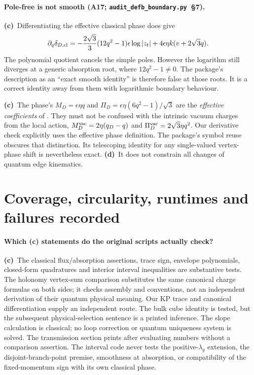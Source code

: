 \documentclass[11pt,a4paper]{article}
\newcommand{\Lc}{\textbf{(c)}\ }
\newcommand{\Ld}{\textbf{(d)}\ }
\newcommand{\scr}{\texttt{audit\_\allowbreak defb\_\allowbreak boundary.py}}
\newcommand{\file}[1]{\texttt{\detokenize{#1}}}
\begin{document}
\paragraph{Pole-free is not smooth (A17; \scr\ §7).}
\Lc Differentiating the effective classical phase does give
\begin{equation}
 \partial_q\delta_{D,\rm cl}
 =-\frac{2\sqrt3}{3}(12q^2-1)\epsilon\log|z_t|
       +4\epsilon\eta k(v+2\sqrt3q).
\end{equation}
The polynomial quotient cancels the simple poles. However the logarithm
still diverges at a generic absorption root, where $12q^2-1\ne0$.
The package's description as an ``exact smooth identity'' is therefore
false at those roots. It is a correct identity away from them with
logarithmic boundary behaviour.

\Lc The phase's $M_D=\epsilon\eta q$ and
$\Pi_D=\epsilon\eta(6q^2-1)/\sqrt3$ are the \emph{effective coefficients}
of \file{defect_semiclassics.tex}. They must not be confused with the
intrinsic vacuum charges from the local action,
$M_D^{\rm vac}=2\eta(q_D-q)$ and $\Pi_D^{\rm vac}=2\sqrt3\eta q^2$.
Our derivative check explicitly uses the effective phase definition.
The package's symbol reuse obscures that distinction. Its telescoping
identity for any single-valued vertex-phase shift is nevertheless exact.
\Ld It does not constrain all changes of quantum edge kinematics.

\section{Coverage, circularity, runtimes and failures recorded}
\paragraph{Which (c) statements do the original scripts actually check?}
\Lc The classical flux/absorption assertions, trace sign, envelope
polynomials, closed-form quadratures and interior interval inequalities are
substantive tests. The holonomy vertex-sum comparison substitutes the same
canonical charge formulas on both sides; it checks assembly and conventions,
not an independent derivation of their quantum physical meaning. Our KP
trace and canonical differentiation supply an independent route.
The bulk cube identity is tested, but the subsequent physical-selection
sentence is a printed inference. The slope calculation is classical;
no loop correction or quantum uniqueness system is solved. The transmission
section prints \file{[PASS]} after evaluating numbers without a comparison
assertion. The interval code never tests the positive-$\lambda_g$ extension,
the disjoint-branch-point premise, smoothness at absorption, or compatibility
of the fixed-momentum sign with its own classical phase.
\end{document}
